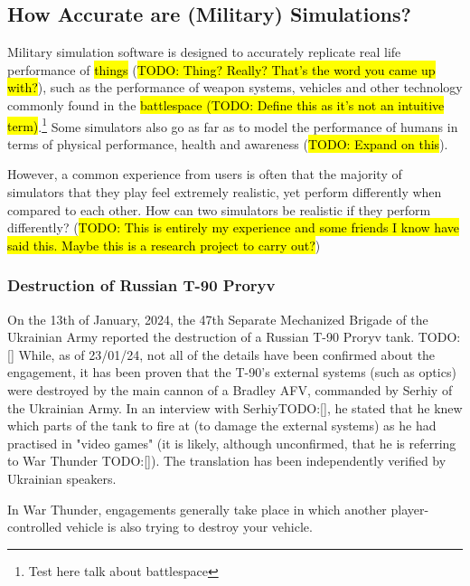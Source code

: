 \documentclass{article}
\begin{document}
\subsection{How Accurate are (Military) Simulations?}

Military simulation software is designed to accurately replicate real life performance of \hl{things} (\hl{TODO: Thing? Really? That's the word you came up with?}), such as the performance of weapon systems, vehicles and other technology commonly found in the \hl{battlespace (TODO: Define this as it's not an intuitive term)}.\footnote{Test here talk about battlespace} Some simulators also go as far as to model the performance of humans in terms of physical performance, health and awareness (\hl{TODO: Expand on this}).

However, a common experience from users is often that the majority of simulators that they play feel extremely realistic, yet perform differently when compared to each other. How can two simulators be realistic if they perform differently? (\hl{TODO: This is entirely my experience and some friends I know have said this. Maybe this is a research project to carry out?})

\subsubsection{Destruction of Russian T-90 Proryv}

On the 13th of January, 2024, the 47th Separate Mechanized Brigade of the Ukrainian Army reported the destruction of a Russian T-90 Proryv tank. TODO: [] While, as of 23/01/24, not all of the details have been confirmed about the engagement, it has been proven that the T-90's external systems (such as optics) were destroyed by the main cannon of a Bradley AFV, commanded by Serhiy of the Ukrainian Army. In an interview with SerhiyTODO:[], he stated that he knew which parts of the tank to fire at (to damage the external systems) as he had practised in "video games" (it is likely, although unconfirmed, that he is referring to War Thunder TODO:[]). The translation has been independently verified by Ukrainian speakers.

In War Thunder, engagements generally take place in which another player-controlled vehicle is also trying to destroy your vehicle.


\end{document}
